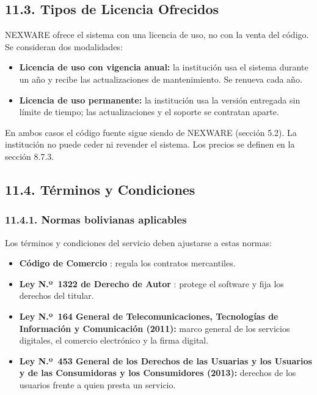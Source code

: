 
\subsection{11.3. Tipos de Licencia Ofrecidos}

NEXWARE ofrece el sistema con una licencia de uso, no con la venta del código. Se consideran dos modalidades:

\begin{itemize}
    \item \textbf{Licencia de uso con vigencia anual:} la institución usa el sistema durante un año y recibe las actualizaciones de mantenimiento. Se renueva cada año.
    \item \textbf{Licencia de uso permanente:} la institución usa la versión entregada sin límite de tiempo; las actualizaciones y el soporte se contratan aparte.
\end{itemize}

En ambos casos el código fuente sigue siendo de NEXWARE (sección 5.2). La institución no puede ceder ni revender el sistema. Los precios se definen en la sección 8.7.3.

\subsection{11.4. Términos y Condiciones}

\subsubsection{11.4.1. Normas bolivianas aplicables}

Los términos y condiciones del servicio deben ajustarse a estas normas:

\begin{itemize}
    \item \textbf{Código de Comercio} \parencite{codigocomercio1977}: regula los contratos mercantiles.
    \item \textbf{Ley N.º~1322 de Derecho de Autor} \parencite{ley1322}: protege el software y fija los derechos del titular.
    \item \textbf{Ley N.º~164 General de Telecomunicaciones, Tecnologías de Información y Comunicación (2011):} marco general de los servicios digitales, el comercio electrónico y la firma digital.
    \item \textbf{Ley N.º~453 General de los Derechos de las Usuarias y los Usuarios y de las Consumidoras y los Consumidores (2013):} derechos de los usuarios frente a quien presta un servicio.
\end{itemize}

